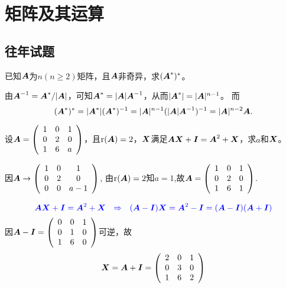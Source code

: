 \section{矩阵及其运算}

\subsection{往年试题}
\begin{frame}

\begin{li}[2005-2006第一学期]
已知$\MA$为$n(n\ge 2)$矩阵，且$\MA$非奇异，求$(\MA^*)^*$。
\end{li}
\pause
\begin{jie}
由$\MA^{-1}=\MA^*/|\MA|$，可知$\MA^*=|\MA|\MA^{-1}$，从而$|\MA^*|=|\MA|^{n-1}$。
而
$$
(\MA^*)^*=|\MA^*|(\MA^*)^{-1}=|\MA|^{n-1}(|\MA|\MA^{-1})^{-1}=|\MA|^{n-2}\MA.
$$
\end{jie}
\end{frame}

\begin{frame}

\begin{li}
设$\MA=\left(
\begin{array}{rrr}
1&0&1\\
0&2&0\\
1&6&a
\end{array}
\right)$，且$\rank(\MA)=2$，$\MX$满足$\MA\MX+\MI=\MA^2+\MX$，求$a$和$\MX$。
\end{li}
\pause

\begin{jie}
因$\MA \rightarrow \left(
\begin{array}{ccc}
1&0&1\\
0&2&0\\
0&0&a-1
\end{array}
\right)$,
由$\rank(\MA)=2$知$a=1$,故$\MA=\left(
\begin{array}{rrr}
1&0&1\\
0&2&0\\
1&6&1
\end{array}
\right)$.
\vspace{0.1in}


$$\blue{
\MA\MX+\MI=\MA^2+\MX ~~\Rightarrow~~
(\MA-\MI)\MX=\MA^2-\MI=(\MA-\MI)(\MA+\MI)
}
$$
因$
\MA-\MI=\left(
\begin{array}{rrr}
0&0&1\\
0&1&0\\
1&6&0
\end{array}
\right)
$可逆，故
$$
\MX=\MA+\MI=\left(
\begin{array}{rrr}
2&0&1\\
0&3&0\\
1&6&2
\end{array}
\right)
$$
\end{jie}
\end{frame}

